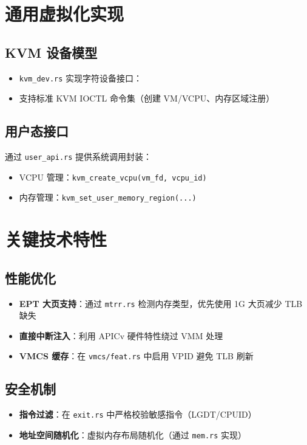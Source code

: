\documentclass{mancls}
\begin{document}
\section{通用虚拟化实现}
\subsection{KVM 设备模型}
\begin{itemize}
    \item \texttt{kvm\_dev.rs} 实现字符设备接口：

    \item 支持标准 KVM IOCTL 命令集（创建 VM/VCPU、内存区域注册）
\end{itemize}

\subsection{用户态接口}
通过 \texttt{user\_api.rs} 提供系统调用封装：
\begin{itemize}
    \item VCPU 管理：\texttt{kvm\_create\_vcpu(vm\_fd, vcpu\_id)}
    \item 内存管理：\texttt{kvm\_set\_user\_memory\_region(...)}
\end{itemize}

\section{关键技术特性}
\subsection{性能优化}
\begin{itemize}
    \item \textbf{EPT 大页支持}：通过 \texttt{mtrr.rs} 检测内存类型，优先使用 1G 大页减少 TLB 缺失
    \item \textbf{直接中断注入}：利用 APICv 硬件特性绕过 VMM 处理
    \item \textbf{VMCS 缓存}：在 \texttt{vmcs/feat.rs} 中启用 VPID 避免 TLB 刷新
\end{itemize}

\subsection{安全机制}
\begin{itemize}
    \item \textbf{指令过滤}：在 \texttt{exit.rs} 中严格校验敏感指令（LGDT/CPUID）
    \item \textbf{地址空间随机化}：虚拟内存布局随机化（通过 \texttt{mem.rs} 实现）
\end{itemize}
\end{document}
